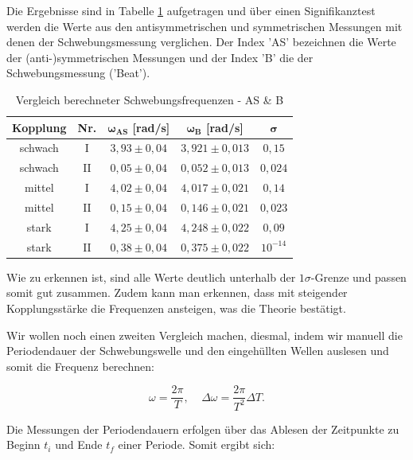 \documentclass{article}
\begin{document}
Die Ergebnisse sind in Tabelle \ref{tab:VGLfreq_AS_B} aufgetragen und über einen Signifikanztest werden die Werte aus den antisymmetrischen und symmetrischen Messungen mit denen der Schwebungsmessung verglichen. Der Index 'AS' bezeichnen die Werte der (anti-)symmetrischen Messungen und der Index 'B' die der Schwebungsmessung ('Beat').

\phantom{.}

\begin{table}[!h]
    \centering
    \begin{tabular}{ccccc}
        \hline
        \textbf{Kopplung} & \textbf{Nr.} & $\bm{\omega_{AS}}$ [rad/s]& $\bm{\omega_B}$ [rad/s]& $\bm{\sigma}$  \\ \hline
        schwach & I & $3,93 \pm 0,04$       & $3,921 \pm 0,013$ & $0,15$  \\
        schwach & II & $0,05 \pm 0,04$  & $0,052 \pm 0,013$ & $0,024$  \\
        mittel & I & $4,02 \pm 0,04$        & $4,017 \pm 0,021$ & $0,14$  \\
        mittel & II & $0,15 \pm 0,04$     & $0,146 \pm 0,021$ & $0,023$  \\
        stark & I & $4,25 \pm 0,04$         & $4,248 \pm 0,022$ & $0,09$  \\
        stark & II & $0,38 \pm 0,04$        & $0,375 \pm 0,022$ & $10^{-14}$  \\ \hline
    \end{tabular}%
    \caption{Vergleich berechneter Schwebungsfrequenzen - AS \& B}
    \label{tab:VGLfreq_AS_B}
\end{table}

\phantom{.}

Wie zu erkennen ist, sind alle Werte deutlich unterhalb der $1\sigma$-Grenze und passen somit gut zusammen. Zudem kann man erkennen, dass mit steigender Kopplungsstärke die Frequenzen ansteigen, was die Theorie bestätigt.

\phantom{.}

Wir wollen noch einen zweiten Vergleich machen, diesmal, indem wir manuell die Periodendauer der Schwebungswelle und den eingehüllten Wellen auslesen und somit die Frequenz berechnen:

\begin{equation}
    \omega = \frac{2 \pi}{T}, \ \ \ \ \ \Delta \omega = \frac{2 \pi}{T^2} \Delta T.
\end{equation}

Die Messungen der Periodendauern erfolgen über das Ablesen der Zeitpunkte zu Beginn $t_i$ und Ende $t_f$ einer Periode. Somit ergibt sich:
\end{document}

